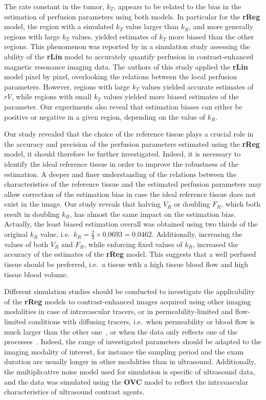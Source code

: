 The rate constant in the tumor, $k_T$, appears to be related to the bias in the estimation of perfusion parameters using both models.
In particular for the \textbf{rReg} model, the region with a simulated $k_T$ value larger than $k_R$, and more generally regions with large $k_T$ values, yielded estimates of $k_T$ more biased than the other regions.
This phenomenon was reported by \citet{CardenasRodriguez:2013em} in a simulation study assessing the ability of the \textbf{rLin} model to accurately quantify perfusion in contrast-enhanced magnetic resonance imaging data.
The authors of this study applied the \textbf{rLin} model pixel by pixel, overlooking the relations between the local perfusion parameters.
However, regions with large $k_T$ values yielded accurate estimates of $rV$, while regions with small $k_T$ values yielded more biased estimates of the parameter.
Our experiments also reveal that estimation biases can either be positive or negative in a given region, depending on the value of $k_R$.

Our study revealed that the choice of the reference tissue plays a crucial role in the accuracy and precision of the perfusion parameters estimated using the \textbf{rReg} model, it should therefore be further investigated.
Indeed, it is necessary to identify the ideal reference tissue in order to improve the robustness of the estimation.
A deeper and finer understanding of the relations between the characteristics of the reference tissue and the estimated perfusion parameters may allow correction of the estimation bias in case the ideal reference tissue does not exist in the image.
Our study reveals that halving $V_R$ or doubling $F_R$, which both result in doubling $k_R$, has almost the same impact on the estimation bias.
Actually, the least biased estimation overall was obtained using two thirds of the original $k_R$ value, i.e.~$k_R = \frac{2}{3} \times 0.0693 = 0.0462$.
Additionally, increasing the values of both $V_R$ and $F_R$, while enforcing fixed values of $k_R$, increased the accuracy of the estimates of the \textbf{rReg} model.
This suggests that a well perfused tissue should be preferred, i.e.~a tissue with a high tissue blood flow and high tissue blood volume.

Different simulation studies should be conducted to investigate the applicability of the \textbf{rReg} models to contrast-enhanced images acquired using other imaging modalities in case of intravascular tracers, or in permeability-limited and flow-limited conditions with diffusing tracers, i.e.~when permeability or blood flow is much larger than the other one~\cite{Tofts:1999ih}, or when the data only reflects one of the processes~\cite{Balvay:2005ca}. 
Indeed, the range of investigated parameters should be adapted to the imaging modality of interest, for instance the sampling period and the exam duration are usually longer in other modalities than in ultrasound.
Additionally, the multiplicative noise model used for simulation is specific of ultrasound data, and the data was simulated using the \textbf{OVC} model to reflect the intravascular characteristics of ultrasound contrast agents. 


